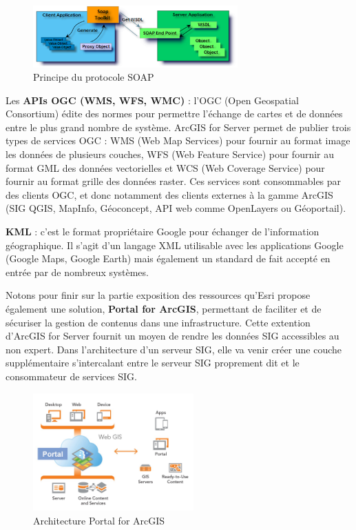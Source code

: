 \documentclass[11pt]{article}
\begin{document}
\begin{figure}[H]
	\center \includegraphics[width=0.70\textwidth]{img/cours/api_soap.png}
	\caption{Principe du protocole SOAP}
\end{figure}

Les \textbf{APIs OGC (WMS, WFS, WMC)} : l'OGC (Open Geospatial Consortium) édite des normes pour permettre l'échange de cartes et de données entre le plus grand nombre de système. ArcGIS for Server permet de publier trois types de services OGC : WMS (Web Map Services) pour fournir au format image les données de plusieurs couches, WFS (Web Feature Service) pour fournir au format GML des données vectorielles et WCS (Web Coverage Service) pour fournir au format grille des données raster. Ces services sont consommables par des clients OGC, et donc notamment des clients externes à la gamme ArcGIS (SIG QGIS, MapInfo, Géoconcept, API web comme OpenLayers ou Géoportail).

\textbf{KML} : c'est le format propriétaire Google pour échanger de l'information géographique. Il s'agit d'un langage XML utilisable avec les applications Google (Google Maps, Google Earth) mais également un standard de fait accepté en entrée par de nombreux systèmes.

Notons pour finir sur la partie exposition des ressources qu'Esri propose également une solution, \textbf{Portal for ArcGIS}, permettant de faciliter et de sécuriser la gestion de contenus dans une infrastructure. Cette extention d'ArcGIS for Server fournit un moyen de rendre les données SIG accessibles au non expert. Dans l'architecture d'un serveur SIG, elle va venir créer une couche supplémentaire s'intercalant entre le serveur SIG proprement dit et le consommateur de services SIG.

\begin{figure}[H]
	\center \includegraphics[width=0.55\textwidth]{img/cours/portal_for_arcgis.jpg}
	\caption{Architecture Portal for ArcGIS}
\end{figure}
\end{document}
